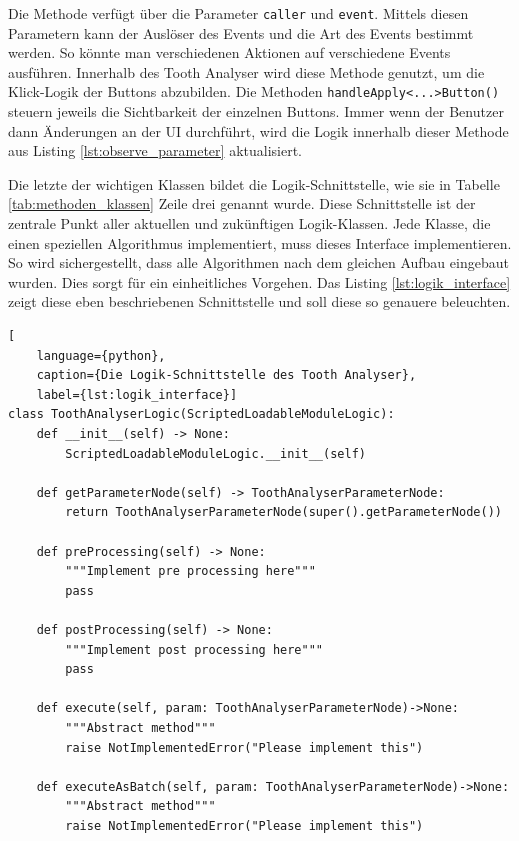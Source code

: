 Die Methode verfügt über die Parameter \texttt{caller} und \texttt{event}.
Mittels diesen Parametern kann der Auslöser des Events und die Art des Events
bestimmt werden. So könnte man verschiedenen Aktionen auf verschiedene Events ausführen.
Innerhalb des Tooth Analyser wird diese Methode genutzt, um die Klick-Logik der Buttons
abzubilden. Die Methoden \texttt{handleApply<...>Button()} steuern jeweils die Sichtbarkeit
der einzelnen Buttons. Immer wenn der Benutzer dann Änderungen an der UI
durchführt, wird die Logik innerhalb dieser Methode aus Listing \ref{lst:observe_parameter}
aktualisiert.

Die letzte der wichtigen Klassen bildet die Logik-Schnittstelle, wie sie in
Tabelle \ref{tab:methoden_klassen} Zeile drei genannt wurde. Diese Schnittstelle
ist der zentrale Punkt aller aktuellen und zukünftigen Logik-Klassen. Jede
Klasse, die einen speziellen Algorithmus implementiert, muss dieses Interface
implementieren. So wird sichergestellt, dass alle Algorithmen nach dem gleichen
Aufbau eingebaut wurden. Dies sorgt für ein einheitliches Vorgehen. Das Listing
\ref{lst:logik_interface} zeigt diese eben beschriebenen Schnittstelle und soll
diese so genauere beleuchten.

\pagebreak

\begin{lstlisting}[
    language={python},
    caption={Die Logik-Schnittstelle des Tooth Analyser},
    label={lst:logik_interface}]
class ToothAnalyserLogic(ScriptedLoadableModuleLogic):
    def __init__(self) -> None:
        ScriptedLoadableModuleLogic.__init__(self)

    def getParameterNode(self) -> ToothAnalyserParameterNode:
        return ToothAnalyserParameterNode(super().getParameterNode())

    def preProcessing(self) -> None:
        """Implement pre processing here"""
        pass

    def postProcessing(self) -> None:
        """Implement post processing here"""
        pass

    def execute(self, param: ToothAnalyserParameterNode)->None:
        """Abstract method"""
        raise NotImplementedError("Please implement this")

    def executeAsBatch(self, param: ToothAnalyserParameterNode)->None:
        """Abstract method"""
        raise NotImplementedError("Please implement this")
\end{lstlisting}

